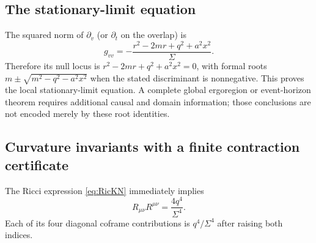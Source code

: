 \documentclass[11pt,a4paper]{article}
\numberwithin{equation}{section}
\theoremstyle{definition}\newtheorem{definition}[theorem]{Definition}
\theoremstyle{remark}\newtheorem{remark}[theorem]{Remark}
\begin{document}
\subsection{The stationary-limit equation}
The squared norm of $\partial_v$ (or $\partial_t$ on the overlap) is
\begin{equation}
 g_{vv}=-\frac{r^2-2mr+q^2+a^2x^2}{\Sigma}.
\end{equation}
Therefore its null locus is $r^2-2mr+q^2+a^2x^2=0$, with formal roots $m\pm\sqrt{m^2-q^2-a^2x^2}$ when the stated discriminant is nonnegative. This proves the local stationary-limit equation. A complete global ergoregion or event-horizon theorem requires additional causal and domain information; those conclusions are not encoded merely by these root identities.

\subsection{Curvature invariants with a finite contraction certificate}
The Ricci expression \eqref{eq:RicKN} immediately implies
\begin{equation}\label{eq:RicSquared}
 R_{\mu\nu}R^{\mu\nu}=\frac{4q^4}{\Sigma^4}.
\end{equation}
Each of its four diagonal coframe contributions is $q^4/\Sigma^4$ after raising both indices.
\end{document}
